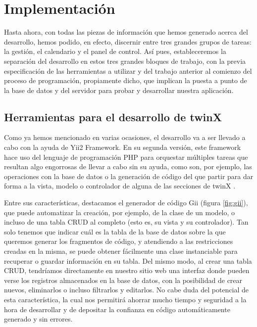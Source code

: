 \chapter{Implementación}

Hasta ahora, con todas las piezas de información que hemos generado acerca del desarrollo, hemos podido, en efecto, discernir entre tres grandes grupos de tareas: la gestión, el calendario y el panel de control. Así pues, estableceremos la separación del desarrollo en estos tres grandes bloques de trabajo, con la previa especificación de las herramientas a utilizar y del trabajo anterior al comienzo del proceso de programación, propiamente dicho, que implican la puesta a punto de la base de datos y del servidor para probar y desarrollar nuestra aplicación.

\section{Herramientas para el desarrollo de twinX}

Como ya hemos mencionado en varias ocasiones, el desarrollo va a ser llevado a cabo con la ayuda de Yii2 Framework. En su segunda versión, este framework hace uso del lenguaje de programación PHP para orquestar múltiples tareas que resultan algo engorrosas de llevar a cabo sin su ayuda, como son, por ejemplo, las operaciones con la base de datos o la generación de código del que partir para dar forma a la vista, modelo o controlador de alguna de las secciones de twinX \cite{yii}.

Entre sus características, destacamos el generador de código Gii (figura \ref{fig:gii}), que puede automatizar la creación, por ejemplo, de la clase de un modelo, o incluso de una tabla CRUD al completo (esto es, su vista y su controlador). Tan solo tenemos que indicar cuál es la tabla de la base de datos sobre la que queremos generar los fragmentos de código, y atendiendo a las restricciones creadas en la misma, se puede obtener fácilmente una clase instanciable para recuperar o guardar información en su tabla. Del mismo modo, al crear una tabla CRUD, tendríamos directamente en nuestro sitio web una interfaz donde pueden verse los registros almacenados en la base de datos, con la posibilidad de crear nuevos, eliminarlos o incluso filtrarlos y editarlos. No cabe duda del potencial de esta característica, la cual nos permitirá ahorrar mucho tiempo y seguridad a la hora de desarrollar y de depositar la confianza en código automáticamente generado y sin errores.


